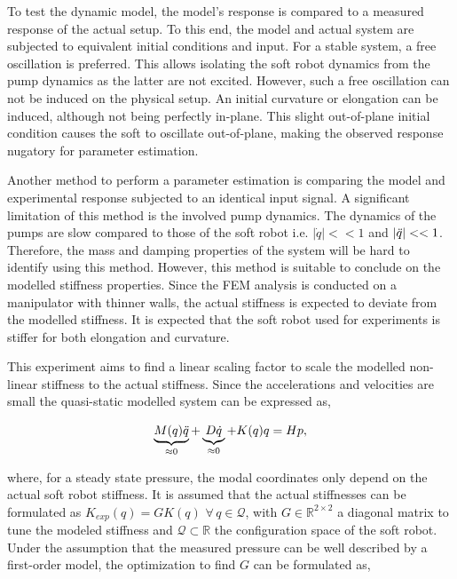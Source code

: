 To test the dynamic model, the model's response is compared to a measured response of the actual setup. To this end, the model and actual system are subjected to equivalent initial conditions and input. For a stable system, a free oscillation is preferred. This allows isolating the soft robot dynamics from the pump dynamics as the latter are not excited. However, such a free oscillation can not be induced on the physical setup. An initial curvature or elongation can be induced, although not being perfectly in-plane. This slight out-of-plane initial condition causes the soft to oscillate out-of-plane, making the observed response nugatory for parameter estimation.


Another method to perform a parameter estimation is comparing the model and experimental response subjected to an identical input signal. A significant limitation of this method is the involved pump dynamics. The dynamics of the pumps are slow compared to those of the soft robot i.e. $|\dot{q}|<< 1$ and $|\Ddot{q}|<< 1 $. Therefore, the mass and damping properties of the system will be hard to identify using this method. However, this method is suitable to conclude on the modelled stiffness properties. Since the FEM analysis is conducted on a manipulator with thinner walls, the actual stiffness is expected to deviate from the modelled stiffness. It is expected that the soft robot used for experiments is stiffer for both elongation and curvature. 

This experiment aims to find a linear scaling factor to scale the modelled non-linear stiffness to the actual stiffness. Since the accelerations and velocities are small the quasi-static modelled system can be expressed as,

\begin{equation}
   \underbrace{M(q) \Ddot{q}}_{\approx 0} + \underbrace{D \dot{q}}_{\approx 0} + K(q) q = Hp,
\end{equation}

where, for a steady state pressure, the modal coordinates only depend on the actual soft robot stiffness. It is assumed that the actual stiffnesses can be formulated as $K_{exp}(q) = G K(q) \hspace{4pt} \forall \hspace{2pt} q \in \mathcal{Q}$, with $G \in \mathbb{R}^{2\times 2}$ a diagonal matrix to tune the modeled stiffness and $\mathcal{Q} \subset \mathbb{R}$ the configuration space of the soft robot. Under the assumption that the measured pressure can be well described by a first-order model, the optimization to find $G$ can be formulated as, 


